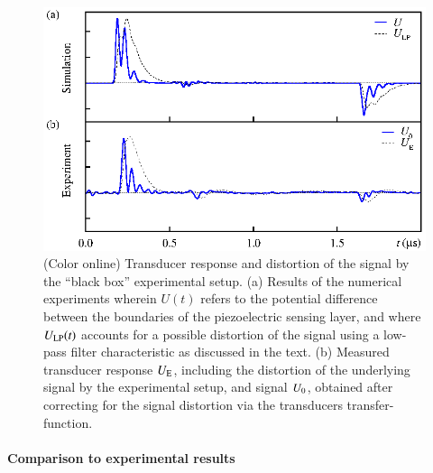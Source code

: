 \documentclass[5p,times,twocolumn]{elsarticle}
\begin{document}
\begin{figure}[th!]
\begin{center}
\includegraphics[width=1.0\linewidth]{./FIGS/transducerSignal_TvsE.eps}
\end{center}
\caption{
(Color online) Transducer response and distortion of the signal by the ``black
box'' experimental setup.  (a) Results of the numerical experiments wherein
$U(t)$ refers to the potential difference between the boundaries of the
piezoelectric sensing layer, and where $U_{\rm{LP}}(t)$ accounts for a possible
distortion of the signal using a low-pass filter characteristic as discussed in
the text.  (b) Measured transducer response $U_{\rm{E}}$, including the
distortion of the underlying signal by the experimental setup, and signal
$U_{\rm{0}}$, obtained after correcting for the signal distortion via the
transducers transfer-function.
\label{fig:TvsE}}
\end{figure}  

\paragraph{Comparison to experimental results}
\end{document}
